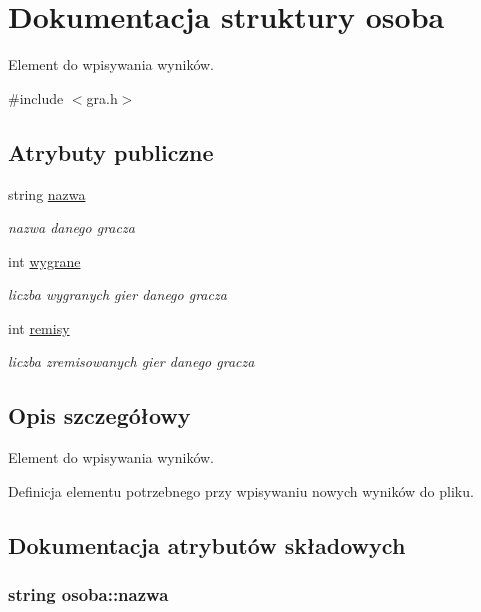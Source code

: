 \hypertarget{structosoba}{}\section{Dokumentacja struktury osoba}
\label{structosoba}


Element do wpisywania wyników.  




{\ttfamily \#include $<$gra.\+h$>$}

\subsection*{Atrybuty publiczne}
\begin{DoxyCompactItemize}
\item 
string \hyperlink{structosoba_aa847f66e739c0749eca2150a5dff5cc1}{nazwa}
\begin{DoxyCompactList}\small\item\em nazwa danego gracza \end{DoxyCompactList}\item 
int \hyperlink{structosoba_a295e28af8e47de1d480d19aa61a105ea}{wygrane}
\begin{DoxyCompactList}\small\item\em liczba wygranych gier danego gracza \end{DoxyCompactList}\item 
int \hyperlink{structosoba_a722ff954254b6eb270c954822299a0a0}{remisy}
\begin{DoxyCompactList}\small\item\em liczba zremisowanych gier danego gracza \end{DoxyCompactList}\end{DoxyCompactItemize}


\subsection{Opis szczegółowy}
Element do wpisywania wyników. 

Definicja elementu potrzebnego przy wpisywaniu nowych wyników do pliku. 

\subsection{Dokumentacja atrybutów składowych}
\subsubsection[{\texorpdfstring{nazwa}{nazwa}}]{\setlength{\rightskip}{0pt plus 5cm}string osoba\+::nazwa}\hypertarget{structosoba_aa847f66e739c0749eca2150a5dff5cc1}{}\label{structosoba_aa847f66e739c0749eca2150a5dff5cc1}


